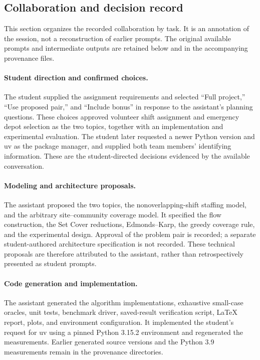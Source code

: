 \subsection{Collaboration and decision record}
This section organizes the recorded collaboration by task. It is an
annotation of the session, not a reconstruction of earlier prompts. The
original available prompts and intermediate outputs are retained below and
in the accompanying provenance files.

\paragraph{Student direction and confirmed choices.}
The student supplied the assignment requirements and selected ``Full project,''
``Use proposed pair,'' and ``Include bonus'' in response to the assistant's
planning questions. These choices approved volunteer shift assignment and
emergency depot selection as the two topics, together with an implementation
and experimental evaluation. The student later requested a newer Python
version and uv as the package manager, and supplied both team members'
identifying information. These are the student-directed decisions evidenced
by the available conversation.

\paragraph{Modeling and architecture proposals.}
The assistant proposed the two topics, the nonoverlapping-shift staffing
model, and the arbitrary site--community coverage model. It specified the
flow construction, the Set Cover reductions, Edmonds--Karp, the greedy
coverage rule, and the experimental design. Approval of the problem pair is
recorded; a separate student-authored architecture specification is not
recorded. These technical proposals are therefore attributed to the
assistant, rather than retrospectively presented as student prompts.

\paragraph{Code generation and implementation.}
The assistant generated the algorithm implementations, exhaustive small-case
oracles, unit tests, benchmark driver, saved-result verification script,
LaTeX report, plots, and environment configuration. It implemented the
student's request for uv using a pinned Python 3.15.2 environment and
regenerated the measurements. Earlier generated source versions and the
Python 3.9 measurements remain in the provenance directories.

